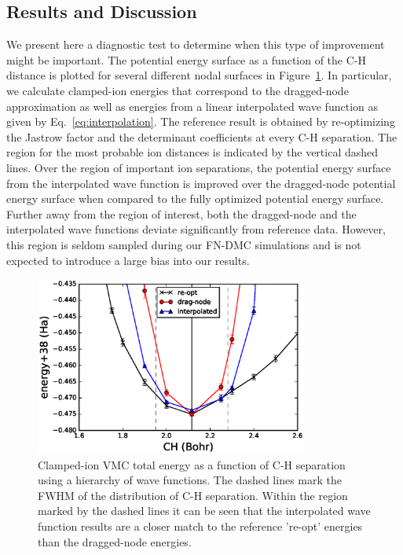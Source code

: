 \subsection{Results and Discussion}
We present here a diagnostic test to determine when this type of improvement might be important.
The potential energy surface as a function of the C-H distance is plotted for several different nodal surfaces in Figure~\ref{fig:ch-cold}.
In particular, we calculate clamped-ion energies that correspond to the dragged-node approximation as well as energies from a linear interpolated wave function as given by Eq.~\ref{eq:interpolation}.
The reference result is obtained by re-optimizing the Jastrow factor and the determinant coefficients at every C-H separation.
The region for the most probable ion distances is indicated by the vertical dashed lines.
Over the region of important ion separations, the potential energy surface from the interpolated wave function is improved over the dragged-node potential energy surface when compared to the fully optimized potential energy surface.
Further away from the region of interest, both the dragged-node and the interpolated wave functions deviate significantly from reference data.
However, this region is seldom sampled during our FN-DMC simulations and is not expected to introduce a large bias into our results.

\begin{figure}[h]
\includegraphics[width=0.8\textwidth]{ch-cold}
\caption{Clamped-ion VMC total energy as a function of C-H separation using a hierarchy of wave functions. The dashed lines mark the FWHM of the distribution of C-H separation.  Within the region marked by the dashed lines it can be seen that the interpolated wave function results are a closer match to the reference 're-opt' energies than the dragged-node energies. \label{fig:ch-cold}}
\end{figure}

